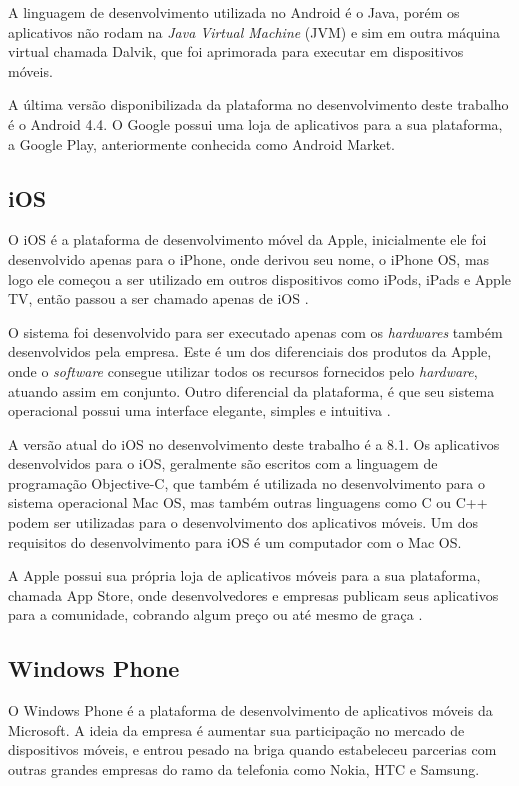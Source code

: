 \documentclass[
	12pt,				%
	openright,			%
	oneside,			%
	a4paper,			%
	chapter=TITLE,		%
	section=TITLE,		%
	english,			%
	french,				%
	spanish,			%
	brazil				%
	]{abntex2}
\begin{document}
A linguagem de desenvolvimento utilizada no Android é o Java, porém os aplicativos não rodam na \textit{Java Virtual Machine} (JVM) e sim em outra máquina virtual chamada Dalvik, que foi aprimorada para executar em dispositivos móveis. 

A última versão disponibilizada da plataforma no desenvolvimento deste trabalho é o Android 4.4. O Google possui uma loja de aplicativos para a sua plataforma, a Google Play, anteriormente conhecida como Android Market.

\subsection{iOS}
O iOS é a plataforma de desenvolvimento móvel da Apple, inicialmente ele foi desenvolvido apenas para o iPhone, onde derivou seu nome, o iPhone OS, mas logo ele começou a ser utilizado em outros dispositivos como iPods, iPads e Apple TV, então passou a ser chamado apenas de iOS \cite{milaniIOS}. 

O sistema foi desenvolvido para ser executado apenas com os \textit{hardwares} também desenvolvidos pela empresa. Este é um dos diferenciais dos produtos da Apple, onde o \textit{software} consegue utilizar todos os recursos fornecidos pelo \textit{hardware}, atuando assim em conjunto. Outro diferencial da plataforma, é que seu sistema operacional possui uma interface elegante, simples e intuitiva \cite{milaniIOS}. 

A versão atual do iOS no desenvolvimento deste trabalho é a 8.1. Os aplicativos desenvolvidos para o iOS, geralmente são escritos com a linguagem de programação Objective-C, que também é utilizada no desenvolvimento para o sistema operacional Mac OS, mas também outras linguagens como C ou C++ podem ser utilizadas para o desenvolvimento dos aplicativos móveis. Um dos requisitos do desenvolvimento para iOS é um computador com o Mac OS. 

A Apple possui sua própria loja de aplicativos móveis para a sua plataforma, chamada App Store, onde desenvolvedores e empresas publicam seus aplicativos para a comunidade, cobrando algum preço ou até mesmo de graça \cite{pilonesIOS}.

\subsection{Windows Phone}
O Windows Phone é a plataforma de desenvolvimento de aplicativos móveis da Microsoft. A ideia da empresa é aumentar sua participação no mercado de dispositivos móveis, e entrou pesado na briga quando estabeleceu parcerias com outras grandes empresas do ramo da telefonia como Nokia, HTC e Samsung. 
\end{document}
